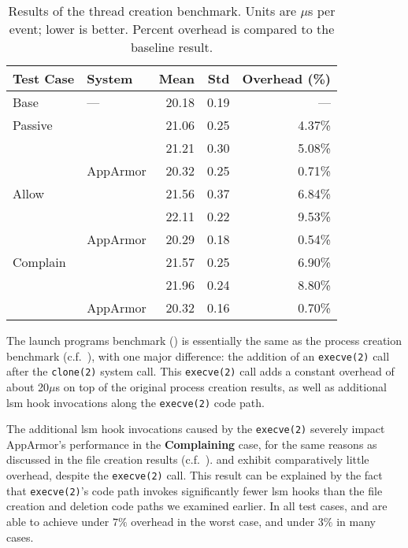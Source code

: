 \begingroup\small
\begin{longtable}[c]{llrrr}
  \caption[Results of the thread creation benchmark]{
    Results of the thread creation benchmark. Units are $\mu$s per event; lower is
    better. Percent overhead is compared to the baseline result.
  }%
  \label{tab:phoronix-threads}\\
  \toprule
   Test Case & System         &  Mean & Std  & Overhead (\%)\\
   \midrule
   Base      & ---            & 20.18 & 0.19 & ---     \\
   \midrule
   Passive   & \bpfbox{}      & 21.06 & 0.25 & 4.37\% \\
             & \bpfcontain{}  & 21.21 & 0.30 & 5.08\% \\
             & AppArmor       & 20.32 & 0.25 & 0.71\% \\
   \midrule
   Allow     & \bpfbox{}      & 21.56 & 0.37 & 6.84\% \\
             & \bpfcontain{}  & 22.11 & 0.22 & 9.53\% \\
             & AppArmor       & 20.29 & 0.18 & 0.54\% \\
   \midrule
   Complain  & \bpfbox{}      & 21.57 & 0.25 & 6.90\% \\
             & \bpfcontain{}  & 21.96 & 0.24 & 8.80\% \\
             & AppArmor       & 20.32 & 0.16 & 0.70\% \\
  \bottomrule
\end{longtable}
\endgroup

The launch programs benchmark () is essentially the
same as the process creation benchmark (c.f.~), with one
major difference: the addition of an \texttt{execve(2)} call after the \texttt{clone(2)}
system call. This \texttt{execve(2)} call adds a constant overhead of about 20$\mu$s on
top of the original process creation results, as well as additional \gls{lsm} hook
invocations along the \texttt{execve(2)} code path.

The additional \gls{lsm} hook invocations caused by the \texttt{execve(2)} severely impact
AppArmor's performance in the \textbf{Complaining} case, for the same reasons as discussed
in the file creation results (c.f.~). \bpfbox{} and \bpfcontain{}
exhibit comparatively little overhead, despite the \texttt{execve(2)} call. This result
can be explained by the fact that \texttt{execve(2)}'s code path invokes significantly
fewer \gls{lsm} hooks than the file creation and deletion code paths we examined earlier.
In all test cases, \bpfbox{} and \bpfcontain{} are able to achieve under $7\%$ overhead in
the worst case, and under $3\%$ in many cases.

